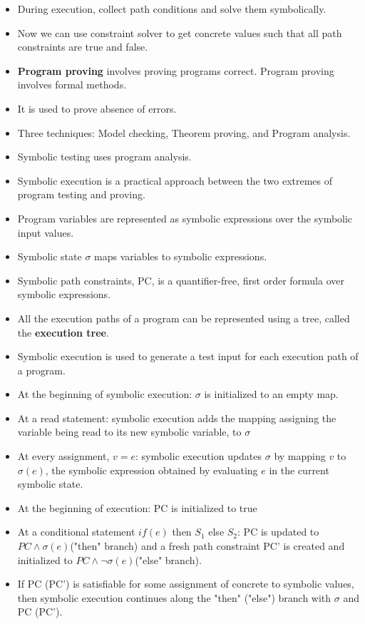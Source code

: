 \documentclass[a4paper]{article}
\begin{document}
\begin{itemize}
    \item During execution, collect path conditions and solve them symbolically.
    \item Now we can use constraint solver to get concrete values such that all path constraints are true and false.
    \item \textbf{Program proving} involves proving programs correct. Program proving involves formal methods.
    \item It is used to prove absence of errors.
    \item Three techniques: Model checking, Theorem proving, and Program analysis.
    \item Symbolic testing uses program analysis.
    \item Symbolic execution is a practical approach between the two extremes of program testing and proving.
    \item Program variables are represented as symbolic expressions over the symbolic input values.
    \item Symbolic state $\sigma$ maps variables to symbolic expressions.
    \item Symbolic path constraints, PC, is a quantifier-free, first order formula over symbolic expressions.
    \item All the execution paths of a program can be represented using a tree, called the \textbf{execution tree}.
    \item Symbolic execution is used to generate a test input for each execution path of a program.
    \item At the beginning of symbolic execution: $\sigma$ is initialized to an empty map.
    \item At a read statement: symbolic execution adds the mapping assigning the variable being read to its new symbolic variable, to $\sigma$
    \item At every assignment, $v=e$: symbolic execution updates $\sigma$ by mapping $v$ to $\sigma(e)$, the symbolic expression obtained by evaluating $e$ in the current symbolic state.
    \item At the beginning of execution: PC is initialized to true
    \item At a conditional statement $if(e)$ then $S_1$ else $S_2$: PC is updated to $PC\land \sigma(e)$("then" branch) and a fresh path constraint PC' is created and initialized to $PC\land \lnot \sigma(e)$("else" branch).
    \item If PC (PC') is satisfiable for some assignment of concrete to symbolic values, then symbolic execution continues along the "then" ("else") branch with $\sigma$ and PC (PC').

\end{itemize}
\end{document}
